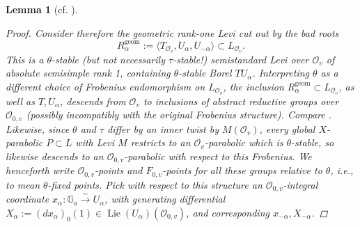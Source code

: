\documentclass[openany]{amsbook}
\newtheorem{lemma}[theorem]{Lemma}
\theoremstyle{definition}
\theoremstyle{remark}
\numberwithin{equation}{section}
\newcommand{\G}{\mathbb{G}}
\renewcommand{\O}{\mathcal{O}}
\renewcommand{\-}{\operatorname{-}}
\newcommand{\on}[1]{\operatorname{#1}}
\newcommand{\Lie}{\on{Lie}}
\begin{document}
\begin{lemma}[{cf. \cite[Lemme 17.6.2, Lemme 17.8.1]{CLII}}]
\begin{proof}
        Consider therefore the \emph{geometric} rank-one Levi cut out by the bad roots 
        $$
            R_\alpha^{\on{geom}} := \langle T_{\O_v}, U_\alpha, U_{-\alpha} \rangle \subset L_{\O_v}.
        $$
        This is a $\theta$-stable (but not necessarily $\tau$-stable!) semistandard Levi over $\O_v$ of absolute semisimple rank 1, containing $\theta$-stable Borel $T U_\alpha$. Interpreting $\theta$ as a different choice of Frobenius endomorphism on $L_{\O_v}$, the inclusion $R_\alpha^{\on{geom}} \subset L_{\O_v}$, as well as $T, U_\alpha$, descends from $\O_v$ to inclusions of abstract reductive groups over $\O_{0,v}$ (possibly incompatibly with the original Frobenius structure). Compare \cite[\S 8.3.3]{ngofl}. Likewise, since $\theta$ and $\tau$ differ by an inner twist by $M(\O_v)$, every global $X$-parabolic $P \subset L$ with Levi $M$ restricts to an $\O_v$-parabolic which is $\theta$-stable, so likewise descends to an $\O_{0,v}$-parabolic with respect to this Frobenius. We henceforth write $\O_{0,v}$-points and $F_{0,v}$-points for all these groups relative to $\theta$, i.e., to mean $\theta$-fixed points. Pick with respect to this structure an $\O_{0,v}$-integral coordinate $x_\alpha : \G_a \xrightarrow{\sim} U_\alpha$, with generating differential $X_\alpha := (dx_\alpha)_0(1) \in \Lie(U_\alpha)(\O_{0,v})$, and corresponding $x_{-\alpha}, X_{-\alpha}$.
        

\end{proof}
\end{lemma}
\end{document}
